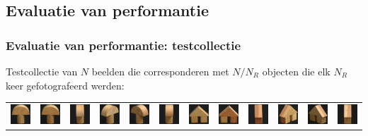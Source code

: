 \documentclass[dutch]{beamer}
\theoremstyle{definition}
\theoremstyle{remark}
\theoremstyle{example}
\begin{document}
\subsection{Evaluatie van performantie}
\frame
{
  \frametitle{Evaluatie van performantie: testcollectie}

  Testcollectie van $N$ beelden die corresponderen met 
  $N/N_R$ objecten die elk $N_R$ keer gefotografeerd werden:

\begin{center}

\begin{tabular}{c@{\ }c@{}c@{}c@{}c@{}c c@{\ }c@{}c@{}c@{}c@{}c}

\includegraphics[width=0.8cm]{coil/beeld-0.eps} &
\includegraphics[width=0.8cm]{coil/beeld-1.eps} &
\includegraphics[width=0.8cm]{coil/beeld-2.eps} &
\includegraphics[width=0.8cm]{coil/beeld-3.eps} &
\includegraphics[width=0.8cm]{coil/beeld-4.eps} &
\includegraphics[width=0.8cm]{coil/beeld-5.eps} &

\includegraphics[width=0.8cm]{coil/beeld-42.eps} &
\includegraphics[width=0.8cm]{coil/beeld-43.eps} &
\includegraphics[width=0.8cm]{coil/beeld-44.eps} &
\includegraphics[width=0.8cm]{coil/beeld-45.eps} &
\includegraphics[width=0.8cm]{coil/beeld-46.eps} &
\includegraphics[width=0.8cm]{coil/beeld-47.eps} \\


\end{tabular}
\end{center}}
\end{document}
